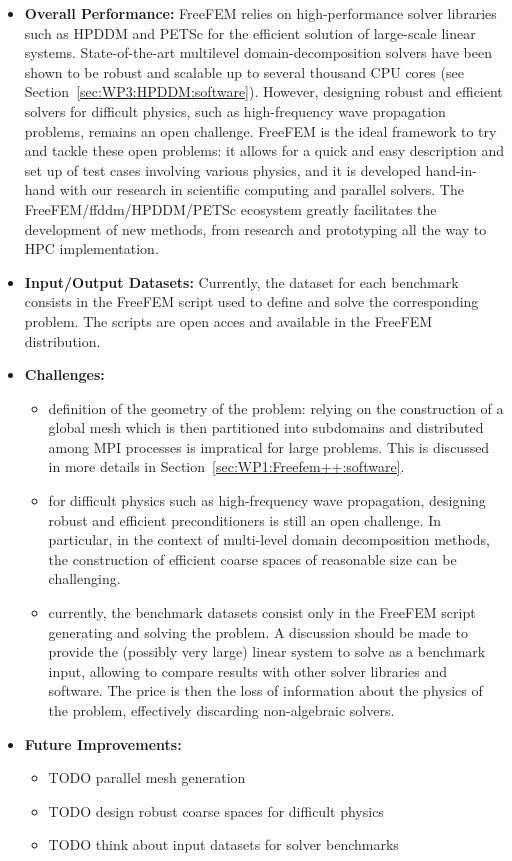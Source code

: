 \begin{itemize}
    \item \textbf{Overall Performance:} FreeFEM relies on high-performance solver libraries such as HPDDM and PETSc for the efficient solution of large-scale linear systems. State-of-the-art multilevel domain-decomposition solvers have been shown to be robust and scalable up to several thousand CPU cores (see Section~\cref{sec:WP3:HPDDM:software}). However, designing robust and efficient solvers for difficult physics, such as high-frequency wave propagation problems, remains an open challenge. FreeFEM is the ideal framework to try and tackle these open problems: it allows for a quick and easy description and set up of test cases involving various physics, and it is developed hand-in-hand with our research in scientific computing and parallel solvers. The FreeFEM/ffddm/HPDDM/PETSc ecosystem greatly facilitates the development of new methods, from research and prototyping all the way to HPC implementation.
    \item \textbf{Input/Output Datasets:} Currently, the dataset for each benchmark consists in the FreeFEM script used to define and solve the corresponding problem. The scripts are open acces and available in the FreeFEM distribution.
    \item \textbf{Challenges:}
        \begin{itemize}
        \item definition of the geometry of the problem: relying on the construction of a global mesh which is then partitioned into subdomains and distributed among MPI processes is impratical for large problems. This is discussed in more details in Section~\cref{sec:WP1:Freefem++:software}.
        \item for difficult physics such as high-frequency wave propagation, designing robust and efficient preconditioners is still an open challenge. In particular, in the context of multi-level domain decomposition methods, the construction of efficient coarse spaces of reasonable size can be challenging.
        \item currently, the benchmark datasets consist only in the FreeFEM script generating and solving the problem. A discussion should be made to provide the (possibly very large) linear system to solve as a benchmark input, allowing to compare results with other solver libraries and software. The price is then the loss of information about the physics of the problem, effectively discarding non-algebraic solvers.
        \end{itemize}
    \item \textbf{Future Improvements:}
        \begin{itemize}
        \item TODO parallel mesh generation
        \item TODO design robust coarse spaces for difficult physics
        \item TODO think about input datasets for solver benchmarks 
        \end{itemize}
\end{itemize}

